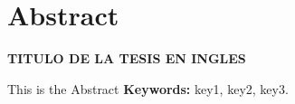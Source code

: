 \chapter{Abstract}
\noindent
{\bfseries\large\MakeUppercase
	TITULO DE LA TESIS EN INGLES
}
\par\vspace{1em}

This is the Abstract
\vfill
\noindent \textbf{Keywords:} key1, key2, key3.
